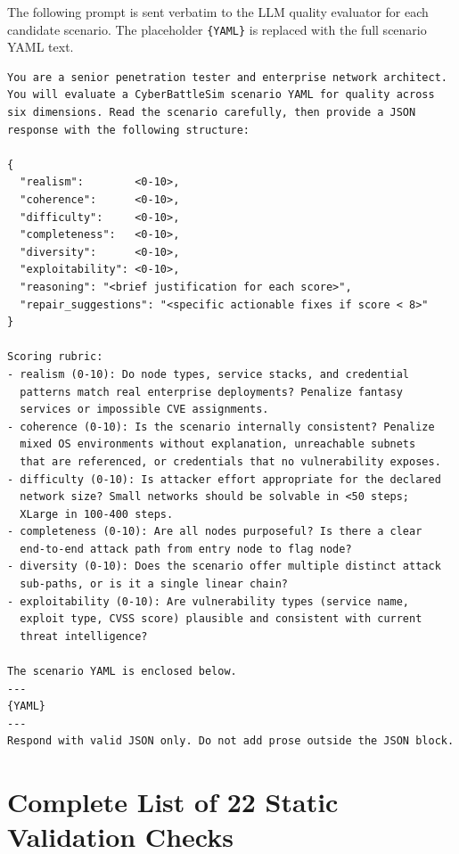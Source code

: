 \documentclass[11pt,a4paper]{article}
\begin{document}
The following prompt is sent verbatim to the LLM quality evaluator for each
candidate scenario.  The placeholder \texttt{\{YAML\}} is replaced with the
full scenario YAML text.

\begin{verbatim}
You are a senior penetration tester and enterprise network architect.
You will evaluate a CyberBattleSim scenario YAML for quality across
six dimensions. Read the scenario carefully, then provide a JSON
response with the following structure:

{
  "realism":        <0-10>,
  "coherence":      <0-10>,
  "difficulty":     <0-10>,
  "completeness":   <0-10>,
  "diversity":      <0-10>,
  "exploitability": <0-10>,
  "reasoning": "<brief justification for each score>",
  "repair_suggestions": "<specific actionable fixes if score < 8>"
}

Scoring rubric:
- realism (0-10): Do node types, service stacks, and credential
  patterns match real enterprise deployments? Penalize fantasy
  services or impossible CVE assignments.
- coherence (0-10): Is the scenario internally consistent? Penalize
  mixed OS environments without explanation, unreachable subnets
  that are referenced, or credentials that no vulnerability exposes.
- difficulty (0-10): Is attacker effort appropriate for the declared
  network size? Small networks should be solvable in <50 steps;
  XLarge in 100-400 steps.
- completeness (0-10): Are all nodes purposeful? Is there a clear
  end-to-end attack path from entry node to flag node?
- diversity (0-10): Does the scenario offer multiple distinct attack
  sub-paths, or is it a single linear chain?
- exploitability (0-10): Are vulnerability types (service name,
  exploit type, CVSS score) plausible and consistent with current
  threat intelligence?

The scenario YAML is enclosed below.
---
{YAML}
---
Respond with valid JSON only. Do not add prose outside the JSON block.
\end{verbatim}

\section{Complete List of 22 Static Validation Checks}
\label{app:checks}
\end{document}
